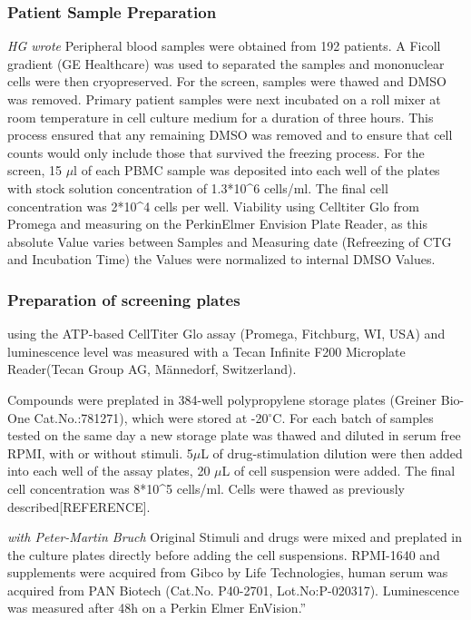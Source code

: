 \documentclass[11pt, a4paper, twosided]{book}
\begin{document}
\hypertarget{patient-sample-preparation}{%
\subsubsection{Patient Sample Preparation}\label{patient-sample-preparation}}

\emph{HG wrote}
Peripheral blood samples were obtained from 192 patients. A Ficoll gradient (GE Healthcare) was used to separated the samples and mononuclear cells were then cryopreserved. For the screen, samples were thawed and DMSO was removed. Primary patient samples were next incubated on a roll mixer at room temperature in cell culture medium for a duration of three hours. This process ensured that any remaining DMSO was removed and to ensure that cell counts would only include those that survived the freezing process. For the screen, 15 \(\mu\)l of each PBMC sample was deposited into each well of the plates with stock solution concentration of 1.3*10\^{}6 cells/ml. The final cell concentration was 2*10\^{}4 cells per well.
Viability using Celltiter Glo from Promega and measuring on the PerkinElmer Envision Plate Reader, as this absolute Value varies between Samples and Measuring date (Refreezing of CTG and Incubation Time) the Values were normalized to internal DMSO Values.

\hypertarget{preparation-of-screening-plates}{%
\subsubsection{Preparation of screening plates}\label{preparation-of-screening-plates}}

using the ATP-based CellTiter Glo assay (Promega, Fitchburg, WI, USA) and luminescence level was measured with a Tecan Infinite F200 Microplate Reader(Tecan Group AG, Männedorf, Switzerland).

Compounds were preplated in 384-well polypropylene storage plates (Greiner Bio-One Cat.No.:781271), which were stored at -20\(^\circ\)C. For each batch of samples tested on the same day a new storage plate was thawed and diluted in serum free RPMI, with or without stimuli. 5\(\mu\)L of drug-stimulation dilution were then added into each well of the assay plates, 20 \(\mu\)L of cell suspension were added. The final cell concentration was 8*10\^{}5 cells/ml. Cells were thawed as previously described{[}REFERENCE{]}.

\emph{with Peter-Martin Bruch} Original
Stimuli and drugs were mixed and preplated in the culture plates directly before adding the cell suspensions. RPMI-1640 and supplements were acquired from Gibco by Life Technologies, human serum was acquired from PAN Biotech (Cat.No. P40-2701, Lot.No:P-020317). Luminescence was measured after 48h on a Perkin Elmer EnVision.''
\end{document}
